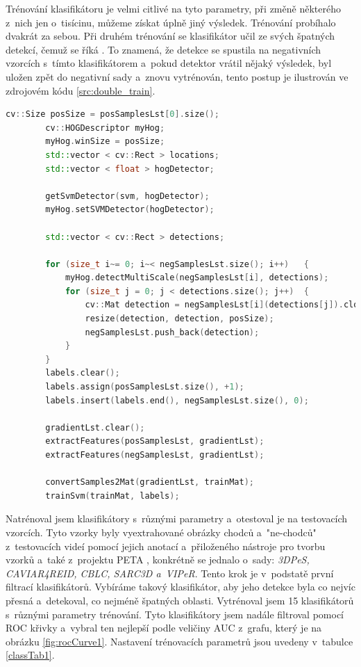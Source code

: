 Trénování klasifikátoru je velmi citlivé na tyto parametry, při změně některého z~nich jen o~tisícinu, můžeme získat úplně jiný výsledek. Trénování probíhalo dvakrát za sebou. Při druhém trénování se klasifikátor učil ze svých špatných detekcí, čemuž se říká  \cite{bootstrap}. To znamená, že detekce se spustila na negativních vzorcích s~tímto klasifikátorem a~pokud detektor vrátil nějaký výsledek, byl uložen zpět do negativní sady a~znovu vytrénován, tento postup je ilustrován ve zdrojovém kódu \ref{src:double_train}.
\newpage

\begin{lstlisting}[label=src:double_train, language=cpp, caption=Bootstrapping]
		cv::Size posSize = posSamplesLst[0].size();
		cv::HOGDescriptor myHog;
		myHog.winSize = posSize;
		std::vector < cv::Rect > locations;
		std::vector < float > hogDetector;
		
		getSvmDetector(svm, hogDetector);
		myHog.setSVMDetector(hogDetector);

		std::vector < cv::Rect > detections;

		for (size_t i~= 0; i~< negSamplesLst.size(); i++)	{
			myHog.detectMultiScale(negSamplesLst[i], detections);
			for (size_t j = 0; j < detections.size(); j++)	{
				cv::Mat detection = negSamplesLst[i](detections[j]).clone();
				resize(detection, detection, posSize);
				negSamplesLst.push_back(detection);
			}
		}
		labels.clear();
		labels.assign(posSamplesLst.size(), +1);
		labels.insert(labels.end(), negSamplesLst.size(), 0);

		gradientLst.clear();
		extractFeatures(posSamplesLst, gradientLst);
		extractFeatures(negSamplesLst, gradientLst);

		convertSamples2Mat(gradientLst, trainMat);
		trainSvm(trainMat, labels);
\end{lstlisting}

Natrénoval jsem klasifikátory s~různými parametry a~otestoval je na testovacích vzorcích. Tyto vzorky byly vyextrahované obrázky chodců a~"ne-chodců" z~testovacích videí pomocí jejich anotací a~přiloženého nástroje pro tvorbu vzorků a~také z~projektu PETA \cite{peta}, konkrétně se jednalo o~sady: \textit{3DPeS, CAVIAR4REID, CBLC, SARC3D a~VIPeR}. Tento krok je v~podstatě první filtrací klasifikátorů. Vybíráme takový klasifikátor, aby jeho detekce byla co nejvíc přesná a~detekoval, co nejméně špatných oblasti. Vytrénoval jsem 15 klasifikátorů s~různými parametry trénování. Tyto klasifikátory jsem nadále filtroval pomocí ROC křivky a~vybral ten nejlepší podle veličiny AUC z~grafu, který je na obrázku \ref{fig:rocCurve1}. Nastavení trénovacích parametrů jsou uvedeny v~tabulce \ref{classTab1}.

